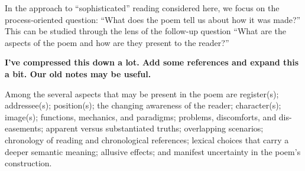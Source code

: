 In the approach to ``sophisticated'' reading considered here, we focus
on the process-oriented question: ``What does the poem tell us about
how it was made?''  This can be studied through the lens of the
follow-up question ``What are the aspects of the poem and how are they
present to the reader?''


\begin{mdframed}
\textbf{I've compressed this down a lot.  Add some references and
  expand this a bit.  Our old notes may be useful.}

Among the several aspects that may be present in the poem are
register(s); addressee(s); position(s); the changing awareness of the
reader; character(s); image(s); functions, mechanics, and paradigms;
problems, discomforts, and dis-easements; apparent versus
substantiated truths; overlapping scenarios; chronology of reading and
chronological references; lexical choices that carry a deeper semantic
meaning; allusive effects; and manifest uncertainty in the poem's
construction.
\end{mdframed}

